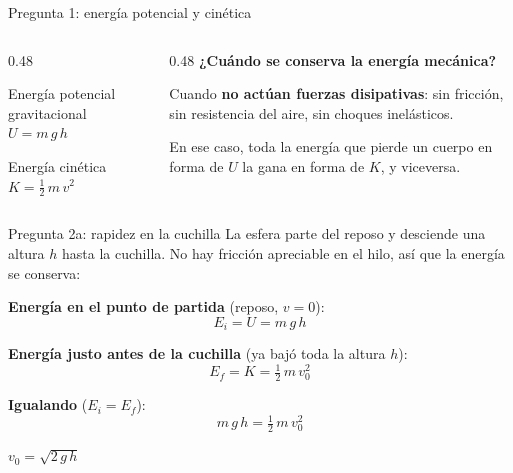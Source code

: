 \documentclass[aspectratio=169,xcolor=dvipsnames]{beamer}
\begin{document}
	\begin{frame}{Pregunta 1: energía potencial y cinética}
		\begin{columns}[T]
			\begin{column}{0.48\textwidth}
				\begin{block}{Energía potencial gravitacional}
					\centering
					\Large $U = m\,g\,h$
				\end{block}
				\vspace{0.3cm}
				\begin{block}{Energía cinética}
					\centering
					\Large $K = \tfrac{1}{2}\,m\,v^{2}$
				\end{block}
			\end{column}
			\begin{column}{0.48\textwidth}
				\small
				\textbf{¿Cuándo se conserva la energía mecánica?}
				
				\vspace{0.2cm}
				\begin{exampleblock}{}
					Cuando \textbf{no actúan fuerzas disipativas}: sin fricción, sin
					resistencia del aire, sin choques inelásticos.
				\end{exampleblock}
				
				\vspace{0.3cm}
				En ese caso, toda la energía que pierde un cuerpo en forma de $U$ la
				gana en forma de $K$, y viceversa.
			\end{column}
		\end{columns}
	\end{frame}
	
	\begin{frame}{Pregunta 2a: rapidez en la cuchilla}
		\small
		La esfera parte del reposo y desciende una altura $h$ hasta la cuchilla.
		No hay fricción apreciable en el hilo, así que la energía se conserva:
		
		\vspace{0.3cm}
		\textbf{Energía en el punto de partida} (reposo, $v=0$):
		\[
		E_i = U = m\,g\,h
		\]
		
		\textbf{Energía justo antes de la cuchilla} (ya bajó toda la altura $h$):
		\[
		E_f = K = \tfrac{1}{2}\,m\,v_0^{2}
		\]
		
		\textbf{Igualando} ($E_i = E_f$):
		\[
		m\,g\,h = \tfrac{1}{2}\,m\,v_0^{2}
		\]
		
		\vspace{0.2cm}
		\begin{exampleblock}{}
			\centering
			\Large $v_0 = \sqrt{2\,g\,h}$
		\end{exampleblock}
	\end{frame}
	
\end{document}
